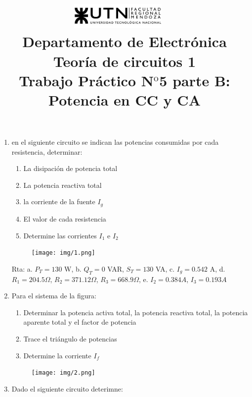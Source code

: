 \documentclass[10pt,a4paper]{article}
\title{
	\textsc{\includegraphics[width=0.35\textwidth]{logoUTN.jpg}} ~\\
	{\large Departamento de Electr\'onica}\\ 
	[0.1cm]
	{\Huge{Teoría de circuitos 1}} \\
	[0.25cm]
	{\Large{Trabajo Práctico N$^{\text {o}}$5 parte B: Potencia en CC y CA}		
}}
\author{}
\date{}
\begin{document}
	\maketitle

\begin{enumerate}
	

\item en el siguiente circuito se indican las potencias consumidas por cada resistencia, determinar:

\begin{enumerate}
	\item La disipación de potencia total
	\item La potencia reactiva total
	\item la corriente de la fuente $I_g$
	\item El valor de cada resistencia 
	\item Determine las corrientes $I_1$ e $I_2$
\end{enumerate}

\begin{figure}[H]
	\centering
	\texttt{[image: img/1.png]}
	\label{e1}
\end{figure}

Rta: a. $P_T=130$ W, b. $Q_T=0$ VAR, $S_T=130$ VA, c. $I_g=0.542$ A, d. $R_1=204.5\Omega$, $R_2=371.12\Omega$, $R_3=668.9\Omega$, e. $I_2=0.384A$, $I_3=0.193A$


\item Para el sistema de la figura: 

\begin{enumerate}
	\item Determinar la potencia activa total, la potencia reactiva total, la potencia aparente total y el factor de potencia  
	\item Trace el triángulo de potencias   
	\item Determine la corriente $I_f$
\end{enumerate}

\begin{figure}[H]
	\centering
	\texttt{[image: img/2.png]}
	\label{e2}
\end{figure}

\item Dado el siguiente circuito deterimne:   


\end{enumerate}
\end{document}
